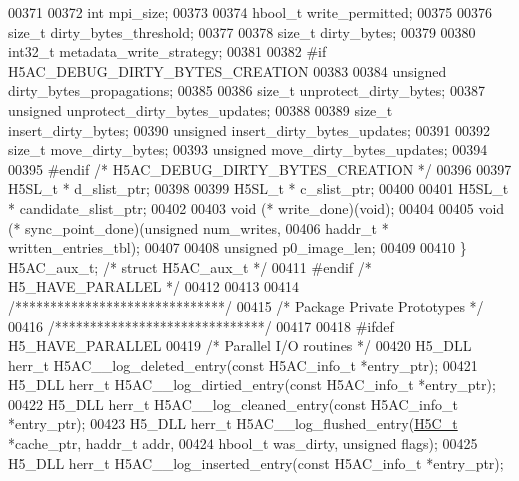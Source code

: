 \begin{DoxyCode}
00371 
00372     \textcolor{keywordtype}{int}     mpi\_size;
00373 
00374     hbool\_t write\_permitted;
00375 
00376     \textcolor{keywordtype}{size\_t}  dirty\_bytes\_threshold;
00377 
00378     \textcolor{keywordtype}{size\_t}  dirty\_bytes;
00379 
00380     int32\_t metadata\_write\_strategy;
00381 
00382 \textcolor{preprocessor}{#if H5AC\_DEBUG\_DIRTY\_BYTES\_CREATION}
00383 
00384     \textcolor{keywordtype}{unsigned}    dirty\_bytes\_propagations;
00385 
00386     \textcolor{keywordtype}{size\_t}      unprotect\_dirty\_bytes;
00387     \textcolor{keywordtype}{unsigned}    unprotect\_dirty\_bytes\_updates;
00388 
00389     \textcolor{keywordtype}{size\_t}      insert\_dirty\_bytes;
00390     \textcolor{keywordtype}{unsigned}    insert\_dirty\_bytes\_updates;
00391 
00392     \textcolor{keywordtype}{size\_t}      move\_dirty\_bytes;
00393     \textcolor{keywordtype}{unsigned}    move\_dirty\_bytes\_updates;
00394 
00395 \textcolor{preprocessor}{#endif }\textcolor{comment}{/* H5AC\_DEBUG\_DIRTY\_BYTES\_CREATION */}\textcolor{preprocessor}{}
00396 
00397     H5SL\_t *    d\_slist\_ptr;
00398 
00399     H5SL\_t *    c\_slist\_ptr;
00400 
00401     H5SL\_t *    candidate\_slist\_ptr;
00402 
00403     void    (* write\_done)(void);
00404 
00405     void    (* sync\_point\_done)(\textcolor{keywordtype}{unsigned} num\_writes, 
00406                                     haddr\_t * written\_entries\_tbl);
00407 
00408     \textcolor{keywordtype}{unsigned}    p0\_image\_len;
00409 
00410 \} H5AC\_aux\_t; \textcolor{comment}{/* struct H5AC\_aux\_t */}
00411 \textcolor{preprocessor}{#endif }\textcolor{comment}{/* H5\_HAVE\_PARALLEL */}\textcolor{preprocessor}{}
00412 
00413 
00414 \textcolor{comment}{/******************************/}
00415 \textcolor{comment}{/* Package Private Prototypes */}
00416 \textcolor{comment}{/******************************/}
00417 
00418 \textcolor{preprocessor}{#ifdef H5\_HAVE\_PARALLEL}
00419 \textcolor{comment}{/* Parallel I/O routines */}
00420 H5\_DLL herr\_t H5AC\_\_log\_deleted\_entry(\textcolor{keyword}{const} H5AC\_info\_t *entry\_ptr);
00421 H5\_DLL herr\_t H5AC\_\_log\_dirtied\_entry(\textcolor{keyword}{const} H5AC\_info\_t *entry\_ptr);
00422 H5\_DLL herr\_t H5AC\_\_log\_cleaned\_entry(\textcolor{keyword}{const} H5AC\_info\_t *entry\_ptr);
00423 H5\_DLL herr\_t H5AC\_\_log\_flushed\_entry(\hyperlink{struct_h5_c__t}{H5C\_t} *cache\_ptr, haddr\_t addr,
00424     hbool\_t was\_dirty, \textcolor{keywordtype}{unsigned} flags);
00425 H5\_DLL herr\_t H5AC\_\_log\_inserted\_entry(\textcolor{keyword}{const} H5AC\_info\_t *entry\_ptr);

\end{DoxyCode}
